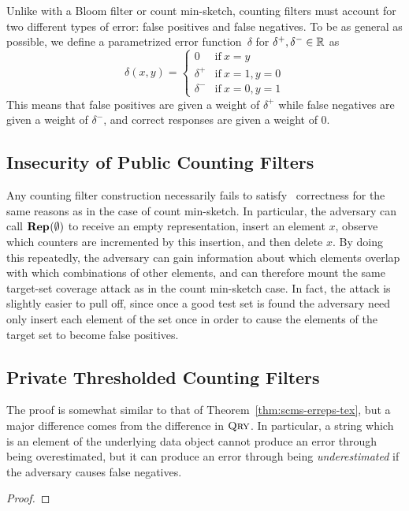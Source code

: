 %
Unlike with a Bloom filter or count min-sketch, counting filters must account
for two different types of error: false positives and false negatives. To be as
general as possible, we define a parametrized error function~$\delta$ for
$\delta^+, \delta^- \in \mathbb{R}$ as
\begin{equation}
  \delta(x, y) =
  \begin{cases}
    0 & \text{if}\ x = y \\
    \delta^+ & \text{if}\ x = 1, y = 0 \\
    \delta^- & \text{if}\ x = 0, y = 1
  \end{cases}
\end{equation}
This means that false positives are given a weight of $\delta^+$ while false
negatives are given a weight of $\delta^-$, and correct responses are given a
weight of 0.

\subsection{Insecurity of Public Counting Filters}
Any counting filter construction necessarily fails to satisfy \errep\
correctness for the same reasons as in the case of count min-sketch. In
particular, the adversary can call $\textup{\textbf{Rep}}\hspace{0.5pt}(\emptyset)$ to receive an empty
representation, insert an element $x$, observe which counters are incremented by
this insertion, and then delete $x$. By doing this repeatedly, the adversary can
gain information about which elements overlap with which combinations of other
elements, and can therefore mount the same target-set coverage attack as in the
count min-sketch case. In fact, the attack is slightly easier to pull off, since
once a good test set is found the adversary need only insert each element of the
set once in order to cause the elements of the target set to become false
positives.

\subsection{Private Thresholded Counting Filters}

\begin{theorem}
\end{theorem}
The proof is somewhat similar to that of Theorem~\ref{thm:scms-erreps-tex},
but a major difference comes from the difference in $\textnormal{\textsc{Qry}}$. In particular,
a string which is an element of the underlying data object cannot
produce an error through being overestimated, but it can produce an error
through being \emph{underestimated} if the adversary causes false negatives.
\begin{proof}
  
\end{proof}
